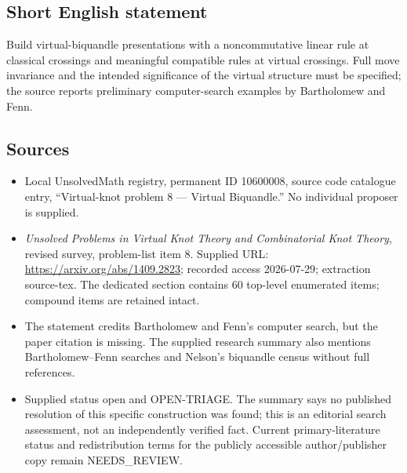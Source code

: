 \documentclass[11pt]{article}
\begin{document}
\subsection{Short English statement}
Build virtual-biquandle presentations with a noncommutative linear rule at classical crossings and meaningful compatible rules at virtual crossings. Full move invariance and the intended significance of the virtual structure must be specified; the source reports preliminary computer-search examples by Bartholomew and Fenn.
\subsection{Sources}
\begin{itemize}
\item Local UnsolvedMath registry, permanent ID 10600008, source code catalogue entry, ``Virtual-knot problem 8 --- Virtual Biquandle.'' No individual proposer is supplied.
\item \emph{Unsolved Problems in Virtual Knot Theory and Combinatorial Knot Theory}, revised survey, problem-list item 8. Supplied URL: \url{https://arxiv.org/abs/1409.2823}; recorded access 2026-07-29; extraction source-tex. The dedicated section contains 60 top-level enumerated items; compound items are retained intact.
\item The statement credits Bartholomew and Fenn's computer search, but the paper citation is missing. The supplied research summary also mentions Bartholomew--Fenn searches and Nelson's biquandle census without full references.
\item Supplied status open and OPEN-TRIAGE. The summary says no published resolution of this specific construction was found; this is an editorial search assessment, not an independently verified fact. Current primary-literature status and redistribution terms for the publicly accessible author/publisher copy remain NEEDS\_REVIEW.
\end{itemize}
\end{document}
